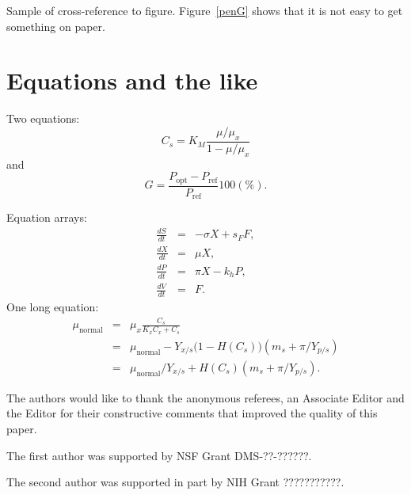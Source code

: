 \documentclass[aoas]{imsart}
\theoremstyle{plain}
\theoremstyle{remark}
\begin{document}
Sample of cross-reference to figure.
Figure~\ref{penG} shows that it is not easy to get something on paper.

\section{Equations and the like}

Two equations:
\begin{equation}
    C_{s}  =  K_{M} \frac{\mu/\mu_{x}}{1-\mu/\mu_{x}} \label{ccs}
\end{equation}
and
\begin{equation}
    G = \frac{P_{\mathrm{opt}} - P_{\mathrm{ref}}}{P_{\mathrm{ref}}}  100(\%).
\end{equation}

Equation arrays:
\begin{eqnarray}
  \frac{dS}{dt} & = & - \sigma X + s_{F} F,\\
  \frac{dX}{dt} & = &   \mu    X,\\
  \frac{dP}{dt} & = &   \pi    X - k_{h} P,\\
  \frac{dV}{dt} & = &   F.
\end{eqnarray}
One long equation:
\begin{eqnarray}
 \mu_{\text{normal}} & = & \mu_{x} \frac{C_{s}}{K_{x}C_{x}+C_{s}}  \nonumber\\
                     & = & \mu_{\text{normal}} - Y_{x/s}\bigl(1-H(C_{s})\bigr)(m_{s}+\pi /Y_{p/s})\\
                     & = & \mu_{\text{normal}}/Y_{x/s}+ H(C_{s}) (m_{s}+ \pi /Y_{p/s}).\nonumber
\end{eqnarray}

\begin{acks}[Acknowledgments]
The authors would like to thank the anonymous referees, an Associate
Editor and the Editor for their constructive comments that improved the
quality of this paper.
\end{acks}

\begin{funding}
The first author was supported by NSF Grant DMS-??-??????.

The second author was supported in part by NIH Grant ???????????.
\end{funding}
\end{document}
